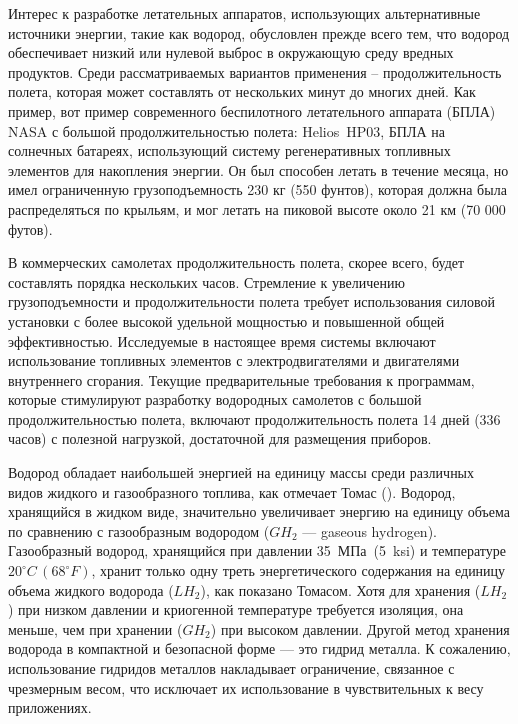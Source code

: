 Интерес к разработке летательных аппаратов, использующих альтернативные источники энергии, такие как водород, обусловлен прежде всего тем, что водород обеспечивает низкий или нулевой выброс в окружающую среду вредных продуктов. Среди рассматриваемых вариантов применения -- продолжительность полета, которая может составлять от нескольких минут до многих дней. Как пример, вот пример современного беспилотного летательного аппарата (БПЛА)  NASA с большой продолжительностью полета: Helios~HP03, БПЛА на солнечных батареях, использующий систему регенеративных топливных элементов для накопления энергии. Он был способен летать в течение месяца, но имел ограниченную грузоподъемность 230 кг (550 фунтов), которая должна была распределяться по крыльям, и мог летать на пиковой высоте около 21 км (70 000 футов).

В коммерческих самолетах продолжительность полета, скорее всего, будет составлять порядка нескольких часов. Стремление к увеличению грузоподъемности и продолжительности полета требует использования силовой установки с более высокой удельной мощностью и повышенной общей эффективностью. Исследуемые в настоящее время системы включают использование топливных элементов с электродвигателями и двигателями внутреннего сгорания. Текущие предварительные требования к программам, которые стимулируют разработку водородных самолетов с большой продолжительностью полета, включают продолжительность полета 14 дней (336 часов) с полезной нагрузкой, достаточной для размещения приборов.

Водород обладает наибольшей энергией на единицу массы среди различных видов жидкого и газообразного топлива, как отмечает Томас (\cite{thomas2000}). Водород, хранящийся в жидком виде, значительно увеличивает энергию на единицу объема по сравнению с газообразным водородом (\(GH_2\) --- gaseous hydrogen). Газообразный водород, хранящийся при давлении 35~МПа~(5~ksi) и температуре \(20^{\circ} C \,(68^{\circ} F)\), хранит только одну треть энергетического содержания на единицу объема жидкого водорода (\(LH_2\)), как показано Томасом. Хотя для хранения (\(LH_2\)) при низком давлении и криогенной температуре требуется изоляция, она меньше, чем при хранении  (\(GH_2\)) при высоком давлении. Другой метод хранения водорода в компактной и безопасной форме --- это гидрид металла. К сожалению, использование гидридов металлов накладывает ограничение, связанное с чрезмерным весом, что исключает их использование в чувствительных к весу приложениях. 

